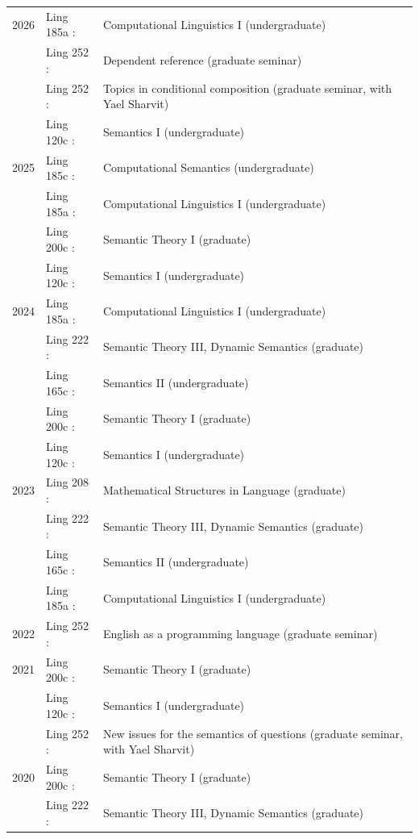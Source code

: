 \documentclass[12pt]{article}
\renewcommand{\arraystretch}{1.25} %
\begin{document}
\begingroup
\renewcommand{\arraystretch}{1} %
\begin{longtable}{L@{}>{\lfstyle}p{0.11\textwidth}<{:}@{}p{0.78\textwidth}@{}}
  2026 & Ling 185a & Computational Linguistics I (undergraduate)\\
       & Ling 252  & Dependent reference (graduate seminar)\\
       & Ling 252  & Topics in conditional composition (graduate seminar, with
                     Yael Sharvit)\\
       & Ling 120c & Semantics I (undergraduate)
  \\[1ex]
  2025 & Ling 185c & Computational Semantics (undergraduate)\\
       & Ling 185a & Computational Linguistics I (undergraduate)\\
       & Ling 200c & Semantic Theory I (graduate)\\
       & Ling 120c & Semantics I (undergraduate)
  \\[1ex]
  2024 & Ling 185a & Computational Linguistics I (undergraduate)\\
       & Ling 222  & Semantic Theory III, Dynamic Semantics (graduate)\\
       & Ling 165c & Semantics II (undergraduate)\\
       & Ling 200c & Semantic Theory I (graduate)\\
       & Ling 120c & Semantics I (undergraduate)
  \\[1ex]
  2023 & Ling 208  & Mathematical Structures in Language (graduate)\\
       & Ling 222  & Semantic Theory III, Dynamic Semantics (graduate)\\
       & Ling 165c & Semantics II (undergraduate)\\
       & Ling 185a & Computational Linguistics I (undergraduate)
  \\[1ex]
  2022 & Ling 252  & English as a programming language (graduate seminar)
  \\[1ex]
  2021 & Ling 200c & Semantic Theory I (graduate)\\
       & Ling 120c & Semantics I (undergraduate)\\
       & Ling 252  & New issues for the semantics of questions (graduate
                     seminar, with Yael Sharvit)
  \\[1ex]
  2020 & Ling 200c & Semantic Theory I (graduate)\\
       & Ling 222  & Semantic Theory III, Dynamic Semantics (graduate)\\

\end{longtable}
\end{document}

